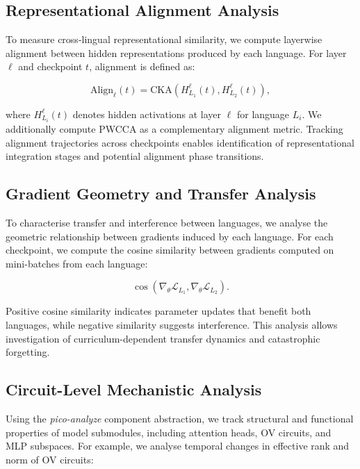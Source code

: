 \subsection{Representational Alignment Analysis}

To measure cross-lingual representational similarity, we compute layerwise alignment between hidden representations produced by each language. For layer \( \ell \) and checkpoint \( t \), alignment is defined as:

\begin{equation}
\text{Align}_\ell(t) = \text{CKA}(H^\ell_{L_1}(t), H^\ell_{L_2}(t)),
\end{equation}

where \( H^\ell_{L_i}(t) \) denotes hidden activations at layer \( \ell \) for language \( L_i \). We additionally compute PWCCA as a complementary alignment metric. Tracking alignment trajectories across checkpoints enables identification of representational integration stages and potential alignment phase transitions.

\subsection{Gradient Geometry and Transfer Analysis}

To characterise transfer and interference between languages, we analyse the geometric relationship between gradients induced by each language. For each checkpoint, we compute the cosine similarity between gradients computed on mini-batches from each language:

\begin{equation}
\cos(\nabla_\theta \mathcal{L}_{L_1}, \nabla_\theta \mathcal{L}_{L_2}).
\end{equation}

Positive cosine similarity indicates parameter updates that benefit both languages, while negative similarity suggests interference. This analysis allows investigation of curriculum-dependent transfer dynamics and catastrophic forgetting.

\subsection{Circuit-Level Mechanistic Analysis}

Using the \textit{pico-analyze} component abstraction, we track structural and functional properties of model submodules, including attention heads, OV circuits, and MLP subspaces. For example, we analyse temporal changes in effective rank and norm of OV circuits:

